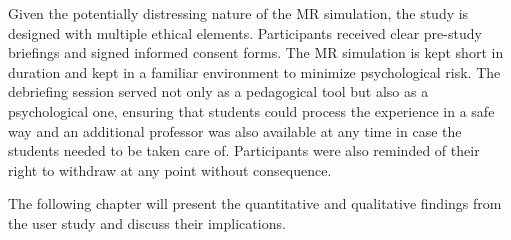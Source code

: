 Given the potentially distressing nature of the MR simulation, the study is designed with multiple ethical elements. Participants received clear pre-study briefings and signed informed consent forms. The MR simulation is kept short in duration and kept in a familiar environment to minimize psychological risk. The debriefing session served not only as a pedagogical tool but also as a psychological one, ensuring that students could process the experience in a safe way and an additional professor was also available at any time in case the students needed to be taken care of. Participants were also reminded of their right to withdraw at any point without consequence.

\vspace{1em}

The following chapter will present the quantitative and qualitative findings from the user study and discuss their implications.

